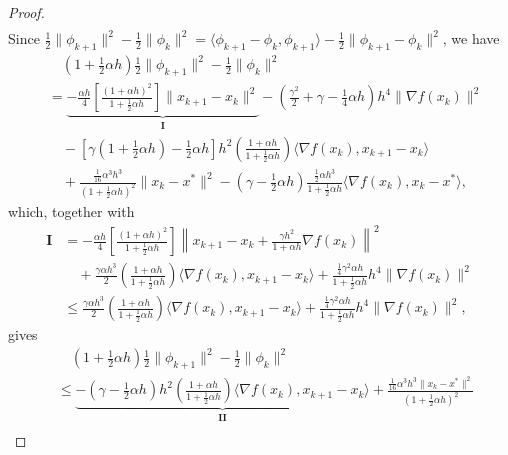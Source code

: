 \documentclass[pdflatex,sn-mathphys-num]{sn-jnl}
\theoremstyle{thmstyleone}
\theoremstyle{thmstyletwo}
\theoremstyle{thmstylethree}
\begin{document}
\begin{appendices}
\begin{proof}
\begin{align*}
\end{align*}
Since $\frac{1}{2}\| \phi_{k+1} \|^2 - \frac{1}{2}\| \phi_k \|^2 = \langle \phi_{k+1}-\phi_k, \phi_{k+1} \rangle - \frac{1}{2}\| \phi_{k+1} - \phi_k \|^2$, we have
\begin{align*}
&\quad \left( 1 + \frac{1}{2}\alpha h \right)\frac{1}{2}\| \phi_{k+1} \|^2 - \frac{1}{2}\| \phi_k \|^2\\
&= \underbrace{ - \frac{\alpha h}{4} \left[\frac{ (1 + \alpha h)^2 }{ 1 + \frac{1}{2}\alpha h }\right]\| x_{k+1}-x_k \|^2 }_{\mathbf{I}} 
  -\left( \frac{\gamma^2}{2} + \gamma - \frac{1}{4}\alpha h \right) h^4 \| \nabla f(x_k) \|^2\\
&\quad - \left[ \gamma \left( 1 + \frac{1}{2}\alpha h \right) - \frac{1}{2}\alpha h \right] h^2 \left(\frac{ 1 + \alpha h }{ 1 + \frac{1}{2}\alpha h }\right) \langle \nabla f(x_k),x_{k+1}-x_k \rangle \\
&\quad + \frac{\frac{1}{16}\alpha^3 h^3}{\left( 1+\frac{1}{2}\alpha h \right)^2}\| x_k - x^* \|^2 
 - \left( \gamma - \frac{1}{2}\alpha h \right)\frac{ \frac{1}{2}\alpha h^3 }{1+\frac{1}{2}\alpha h}\langle \nabla f(x_k), x_k-x^* \rangle,
\end{align*}
which, together with
\begin{align*}
\mathbf{I}
&= - \frac{\alpha h}{4} \left[\frac{ (1 + \alpha h)^2 }{ 1 + \frac{1}{2}\alpha h }\right] \left\| x_{k+1}-x_k + \frac{\gamma h^2}{1+\alpha h} \nabla f(x_k) \right\|^2 \\
&\quad + \frac{\gamma\alpha h^3}{2} \left( \frac{1+\alpha h}{1+\frac{1}{2}\alpha h} \right) \langle \nabla f(x_k), x_{k+1}-x_k \rangle
   + \frac{ \frac{1}{4}\gamma^2 \alpha h }{1 + \frac{1}{2}\alpha h}h^4 \| \nabla f(x_k) \|^2\\
&\le \frac{\gamma\alpha h^3}{2} \left( \frac{1+\alpha h}{1+\frac{1}{2}\alpha h} \right) \langle \nabla f(x_k), x_{k+1}-x_k \rangle
   + \frac{ \frac{1}{4}\gamma^2 \alpha h }{1 + \frac{1}{2}\alpha h}h^4 \| \nabla f(x_k) \|^2,    
\end{align*}
gives
\begin{align*}
&\quad \left( 1 + \frac{1}{2}\alpha h \right)\frac{1}{2}\| \phi_{k+1} \|^2 - \frac{1}{2}\| \phi_k \|^2\\
&\le \underbrace{ - \left( \gamma - \frac{1}{2}\alpha h \right) h^2 \left(\frac{ 1 + \alpha h }{ 1 + \frac{1}{2}\alpha h }\right) \langle \nabla f(x_k),x_{k+1}-x_k \rangle }_{\mathbf{II}}
   + \frac{\frac{1}{16}\alpha^3 h^3 \| x_k - x^* \|^2 }{\left( 1+\frac{1}{2}\alpha h \right)^2} \\

\end{align*}
\end{proof}
\end{appendices}
\end{document}
